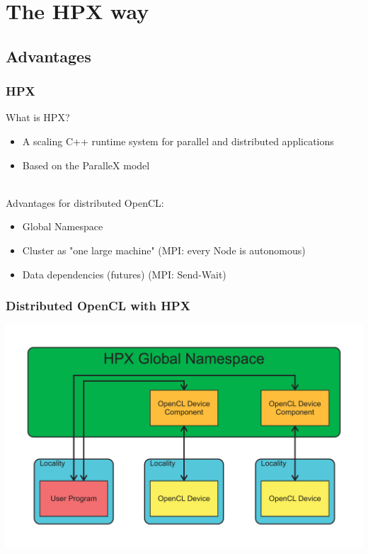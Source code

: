 \documentclass{beamer}
\begin{document}
\section{The HPX way}

\subsection{Advantages}
\begin{frame}
    \frametitle{HPX}
    What is HPX?
    \begin{itemize}
        \item A scaling C++ runtime system for parallel and distributed applications
        \item Based on the ParalleX model
    \end{itemize}
    ~\\
    Advantages for distributed OpenCL:
    \begin{itemize}
        \item Global Namespace
        \item Cluster as "one large machine" (MPI: every Node is autonomous)
        \item Data dependencies (futures) (MPI: Send-Wait)
    \end{itemize}
\end{frame}

\begin{frame}
    \frametitle{Distributed OpenCL with HPX}
    \begin{center}
        \includegraphics[width=\textwidth]{../2014-09-25_gputalk/hpx_opencl.pdf}
    \end{center}
\end{frame}
\end{document}
